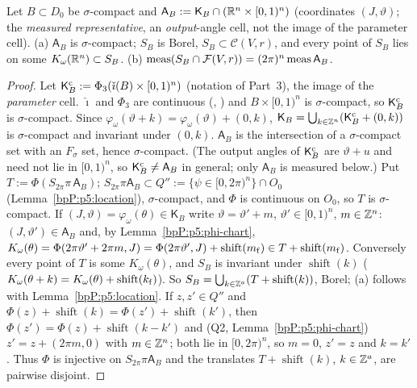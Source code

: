 \begin{lemma}\label{bpP:p5:cell-transfer}
Let $B\subset D_0$ be $\sigma$-compact and $\mathsf A_B:=\mathsf K_B\cap(\mathbb{R}^n\times[0,1)^n)$ (coordinates $(J,\vartheta)$; the \emph{measured representative}, an \emph{output}-angle cell, not the image of the parameter cell). (a) $\mathsf A_B$ is $\sigma$-compact; $S_B$ is Borel, $S_B\subset\mathcal C(V,r)$, and every point of $S_B$ lies on some $K_\omega(\mathbb{R}^n)\subset S_B$. (b) $\operatorname{meas}(S_B\cap\mathcal F(V,r))=(2\pi)^n\operatorname{meas}\mathsf A_B$.
\end{lemma}
\begin{proof}
\label{stepP:p5:ct-cell} Let $\mathsf K^{\rm c}_B:=\Phi_3(\check\imath(B)\times[0,1)^n)$ (notation of Part~3), the image of the \emph{parameter} cell. $\check\imath$ and $\Phi_3$ are continuous (, ) and $B\times[0,1)^n$ is $\sigma$-compact, so $\mathsf K^{\rm c}_B$ is $\sigma$-compact. Since $\varphi_\omega(\vartheta+k)=\varphi_\omega(\vartheta)+(0,k)$, $\mathsf K_B=\bigcup_{k\in\mathbb{Z}^n}(\mathsf K^{\rm c}_B+(0,k))$ is $\sigma$-compact and invariant under $(0,k)$. $\mathsf A_B$ is the intersection of a $\sigma$-compact set with an $F_\sigma$ set, hence $\sigma$-compact. (The output angles of $\mathsf K^{\rm c}_B$ are $\vartheta+u$ and need not lie in $[0,1)^n$, so $\mathsf K^{\rm c}_B\ne\mathsf A_B$ in general; only $\mathsf A_B$ is measured below.)
\label{stepP:p5:ct-dec} Put $T:=\Phi(S_{2\pi}\pi\,\mathsf A_B)$; $S_{2\pi}\pi\mathsf A_B\subset Q'':=\{\psi\in[0,2\pi)^n\}\cap O_0$ (Lemma~\ref{bpP:p5:location}), $\sigma$-compact, and $\Phi$ is continuous on $O_0$, so $T$ is $\sigma$-compact. If $(J,\vartheta)=\varphi_\omega(\theta)\in\mathsf K_B$ write $\vartheta=\vartheta'+m$, $\vartheta'\in[0,1)^n$, $m\in\mathbb{Z}^n$: $(J,\vartheta')\in\mathsf A_B$ and, by Lemma~\ref{bpP:p5:phi-chart}, $K_\omega(\theta)=\Phi(2\pi\vartheta'+2\pi m,J)=\Phi(2\pi\vartheta',J)+\operatorname{shift}(m_{\rm f})\in T+\operatorname{shift}(m_{\rm f})$. Conversely every point of $T$ is some $K_\omega(\theta)$, and $S_B$ is invariant under $\operatorname{shift}(k)$ ($K_\omega(\theta+k)=K_\omega(\theta)+\operatorname{shift}(k_{\rm f})$). So $S_B=\bigcup_{k\in\mathbb{Z}^a}(T+\operatorname{shift}(k))$, Borel; (a) follows with Lemma~\ref{bpP:p5:location}.
\label{stepP:p5:ct-disj} If $z,z'\in Q''$ and $\Phi(z)+\operatorname{shift}(k)=\Phi(z')+\operatorname{shift}(k')$, then $\Phi(z')=\Phi(z)+\operatorname{shift}(k-k')$ and (Q2, Lemma~\ref{bpP:p5:phi-chart}) $z'=z+(2\pi m,0)$ with $m\in\mathbb{Z}^n$; both lie in $[0,2\pi)^n$, so $m=0$, $z'=z$ and $k=k'$. Thus $\Phi$ is injective on $S_{2\pi}\pi\mathsf A_B$ and the translates $T+\operatorname{shift}(k)$, $k\in\mathbb{Z}^a$, are pairwise disjoint.

\end{proof}
